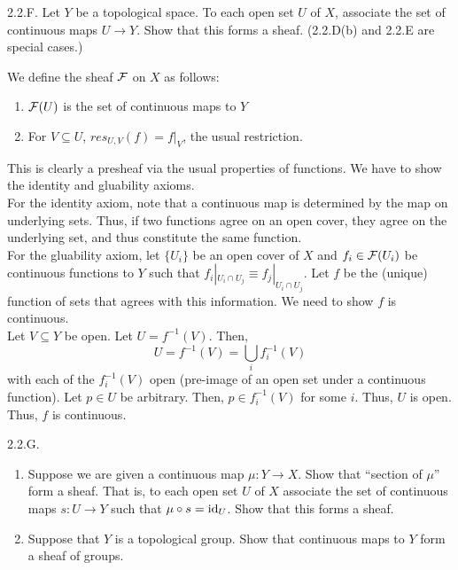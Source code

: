 \begin{exercise}{2.2.F.} 
    Let $Y$ be a topological space. To each open set $U$ of $X$, associate the set of continuous maps $U \to Y$. Show that this forms a sheaf. (2.2.D(b) and 2.2.E are special cases.) 
\end{exercise}
\begin{solution}
    We define the sheaf $\mathcal{F}$ on $X$ as follows:
    \begin{enumerate}[itemsep=1pt, topsep=1pt]
        \item $\mathcal{F}(U)$ is the set of continuous maps to $Y$
        \item For $V \subseteq U$, $res_{U,V}(f) = f|_V$, the usual restriction.
    \end{enumerate}
    This is clearly a presheaf via the usual properties of functions. We have to show the identity and gluability axioms. \\
    For the identity axiom, note that a continuous map is determined by the map on underlying sets. Thus, if two functions agree on an open cover, they agree on the underlying set, and thus constitute the same function. \\
    For the gluability axiom, let $\{U_i\}$ be an open cover of $X$ and $f_i \in \mathcal{F}(U_i)$ be continuous functions to $Y$ such that $f_i|_{U_i \cap U_j} \equiv f_j|_{U_i \cap U_j}$. Let $f$ be the (unique) function of sets that agrees with this information. We need to show $f$ is continuous. \\
    Let $V \subseteq Y$ be open. Let $U = f^{-1}(V)$. Then, 
    \[ U = f^{-1}(V) = \bigcup_i f_i^{-1}(V) \]
    with each of the $f_i^{-1}(V)$ open (pre-image of an open set under a continuous function). Let $p \in U$ be arbitrary. Then, $p \in f_i^{-1}(V)$ for some $i$. Thus, $U$ is open. Thus, $f$ is continuous.
\end{solution}

\begin{exercise}{2.2.G.}
    \begin{enumerate}[itemsep=1pt, topsep=1pt]
        \item Suppose we are given a continuous map $\mu: Y \to X$. Show that ``section of $\mu$'' form a sheaf. That is, to each open set $U$ of $X$ associate the set of continuous maps $s: U \to Y$ such that $\mu \circ s = \operatorname{id}_U$. Show that this forms a sheaf.
        \item Suppose that $Y$ is a topological group. Show that continuous maps to $Y$ form a sheaf of groups.
    \end{enumerate}
\end{exercise}
\begin{solution}
    \todo{}
\end{solution}

